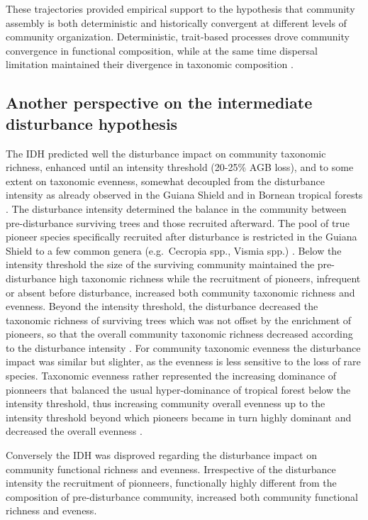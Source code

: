 \documentclass[fleqn,10pt]{ArtEcoFoG} %
\begin{document}
These trajectories provided empirical support to the hypothesis that
community assembly is both deterministic and historically convergent at
different levels of community organization. Deterministic, trait-based
processes drove community convergence in functional composition, while
at the same time dispersal limitation maintained their divergence in
taxonomic composition \citep{Fukami2005}.

\subsection{Another perspective on the intermediate disturbance
hypothesis}\label{another-perspective-on-the-intermediate-disturbance-hypothesis}

The IDH predicted well the disturbance impact on community taxonomic
richness, enhanced until an intensity threshold (20-25\% AGB loss), and
to some extent on taxonomic evenness, somewhat decoupled from the
disturbance intensity as already observed in the Guiana Shield
\citep{Baraloto2012a} and in Bornean tropical forests
\citep{Cannon1998}. The disturbance intensity determined the balance in
the community between pre-disturbance surviving trees and those
recruited afterward. The pool of true pioneer species specifically
recruited after disturbance is restricted in the Guiana Shield to a few
common genera (e.g.~Cecropia spp., Vismia spp.) \citep{Guitet2018}.
Below the intensity threshold the size of the surviving community
maintained the pre-disturbance high taxonomic richness while the
recruitment of pioneers, infrequent or absent before disturbance,
increased both community taxonomic richness and evenness. Beyond the
intensity threshold, the disturbance decreased the taxonomic richness of
surviving trees which was not offset by the enrichment of pioneers, so
that the overall community taxonomic richness decreased according to the
disturbance intensity \citep{Molino2001}. For community taxonomic
evenness the disturbance impact was similar but slighter, as the
evenness is less sensitive to the loss of rare species. Taxonomic
evenness rather represented the increasing dominance of pionneers that
balanced the usual hyper-dominance of tropical forest below the
intensity threshold, thus increasing community overall evenness up to
the intensity threshold beyond which pioneers became in turn highly
dominant and decreased the overall evenness \citep{Baraloto2012a}.

Conversely the IDH was disproved regarding the disturbance impact on
community functional richness and evenness. Irrespective of the
disturbance intensity the recruitment of pionneers, functionally highly
different from the composition of pre-disturbance community, increased
both community functional richness and eveness.
\end{document}
